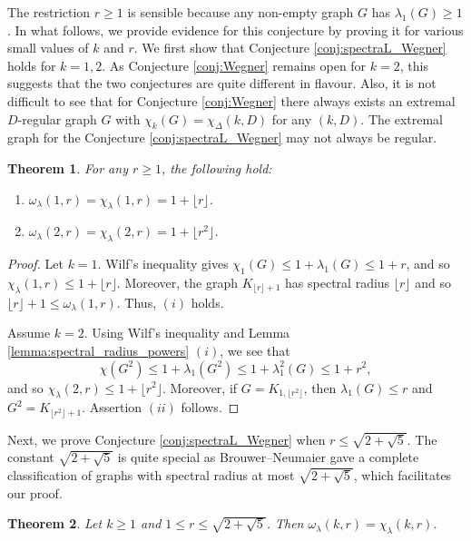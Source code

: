\documentclass[11pt]{article}
\theoremstyle{plain}
\newtheorem{theorem}{Theorem}[section]
\numberwithin{equation}{section}
\begin{document}
The restriction $r\ge 1$ is sensible because any non-empty graph $G$ has $\lambda_1(G)\ge 1$. In what follows, we provide evidence for this conjecture by proving it for various small values of $k$ and $r$. We first show that Conjecture \ref{conj:spectraL_Wegner} holds for $k=1,2$. As Conjecture \ref{conj:Wegner} remains open for $k=2$, this suggests that the two conjectures are quite different in flavour. Also, it is not difficult to see that for Conjecture \ref{conj:Wegner} there always exists an extremal $D$-regular graph $G$ with $\chi_k(G) = \chi_\Delta(k, D)$ for any $(k, D)$. The extremal graph for the Conjecture \ref{conj:spectraL_Wegner} may not always be regular.   

\begin{theorem}\label{thm:spectral_Wegner_k_1_2} For any $r\ge 1$, the following hold:
\begin{enumerate}[$(i)$]
    \item $\omega_\lambda(1,r) = \chi_\lambda(1,r) = 1 + \lfloor r\rfloor$.
    \item $\omega_\lambda(2,r) = \chi_\lambda(2,r) = 1 + \lfloor r^2\rfloor $.
\end{enumerate}
\end{theorem}

\begin{proof} Let $k=1$. Wilf's inequality gives $\chi_1(G)\le 1 + \lambda_1(G) \le 1 +r$, and so $\chi_\lambda(1,r)\le 1 + \lfloor r\rfloor$. Moreover, the graph $K_{\lfloor r\rfloor +1}$ has spectral radius $\lfloor r\rfloor$ and so $\lfloor r\rfloor +1 \le \omega_\lambda(1,r)$.
Thus, $(i)$ holds. 

Assume $k=2$. Using Wilf's inequality and Lemma \ref{lemma:spectral_radius_powers} $(i)$, we see that 
\[ \chi(G^2)\le 1 + \lambda_1(G^2)\le 1 + \lambda_1^2(G) \le 1 + r^2,\]
and so $\chi_\lambda(2,r)\le 1 + \lfloor r^2\rfloor$. Moreover, if $G =K_{1,\lfloor r^2\rfloor}$, then $\lambda_1(G)\le r$ and $G^2 = K_{\lfloor r^2\rfloor+1}$. Assertion $(ii)$ follows. 
\end{proof}

Next, we prove Conjecture \ref{conj:spectraL_Wegner} when $r\le \sqrt{2+\sqrt{5}}$. The constant $\sqrt{2+\sqrt{5}}$ is quite special as Brouwer--Neumaier \cite{Brouwer_Neumaier_1989} gave a complete classification of graphs with spectral radius at most $\sqrt{2+\sqrt{5}}$, which facilitates our proof.  

\begin{theorem} Let $k\ge 1$ and $1\le r\le \sqrt{2+\sqrt{5}}$. Then $\omega_\lambda(k,r) = \chi_\lambda(k,r)$.
\end{theorem}
\end{document}

